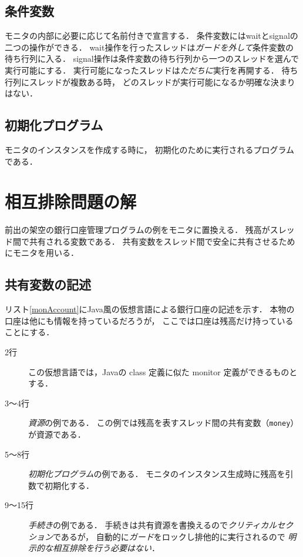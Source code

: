 \subsection{条件変数}
モニタの内部に必要に応じて名前付きで宣言する．
条件変数にはwaitとsignalの二つの操作ができる．
wait操作を行ったスレッドは\emph{ガードを外して}条件変数の待ち行列に入る．
signal操作は条件変数の待ち行列から一つのスレッドを選んで実行可能にする．
実行可能になったスレッドは\emph{ただちに}実行を再開する．
待ち行列にスレッドが複数ある時，
どのスレッドが実行可能になるか明確な決まりはない．

\subsection{初期化プログラム}
モニタのインスタンスを作成する時に，
初期化のために実行されるプログラムである．

\section{相互排除問題の解}
前出の架空の銀行口座管理プログラムの例をモニタに置換える．
残高がスレッド間で共有される変数である．
共有変数をスレッド間で安全に共有させるためにモニタを用いる．

\subsection{共有変数の記述}
リスト\ref{monAccount}にJava風の仮想言語による銀行口座の記述を示す．
本物の口座は他にも情報を持っているだろうが，
ここでは口座は残高だけ持っていることにする．



\begin{description}
\item [2行]
  この仮想言語では，Javaの class 定義に似た monitor 定義ができるものとする．
\item [3〜4行]
  \emph{資源}の例である．
  この例では残高を表すスレッド間の共有変数（\texttt{money}）が資源である．
\item [5〜8行]
  \emph{初期化プログラム}の例である．
  モニタのインスタンス生成時に残高を引数で初期化する．
\item [9〜15行]
  \emph{手続き}の例である．
  手続きは共有資源を書換えるので\emph{クリティカルセクション}であるが，
  自動的に\emph{ガード}をロックし排他的に実行されるので
  \emph{明示的な相互排除を行う必要はない}．
\end{description}

